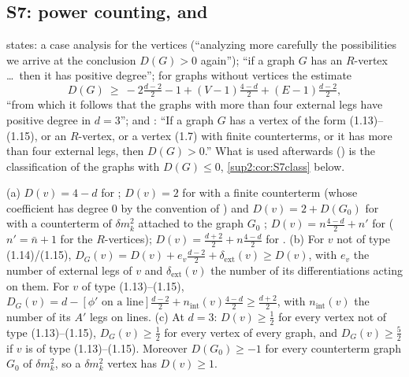 
\subsection{S7: power counting, \cite[(2.17)]{Ba3} and \cite[Cor.~2.3]{Ba3}}\label{sup2:ssec:S7}

\cite[pp.~428--429]{Ba3} states: a case analysis for the vertices \cite[(1.13)--(1.15)]{Ba3} (``analyzing more carefully the possibilities we arrive at the conclusion $D(G)>0$ again''); ``if a graph $G$ has an $R$-vertex \dots\ then it has positive degree''; for graphs without \cite[(1.13)--(1.15)]{Ba3} vertices the estimate
\begin{equation}\label{sup2:eq:217}
D(G)\ \ge\ -2\tfrac{d-2}2-1+(V-1)\tfrac{4-d}2+(E-1)\tfrac{d-2}2,\tag{2.17}
\end{equation}
``from which it follows that the graphs with more than four external legs have positive degree in $d=3$''; and \cite[Cor.~2.3]{Ba3}: ``If a graph $G$ has a vertex of the form (1.13)--(1.15), or an $R$-vertex, or a vertex (1.7) with finite counterterms, or it has more than four external legs, then $D(G)>0$.'' What is used afterwards (\cite[pp.~429--432]{Ba3}) is the classification of the graphs with $D(G)\le0$, \cref{sup2:cor:S7class} below.

\begin{lemma}\label{sup2:lem:S7vert}
\textup{(a)} $D(v)=4-d$ for \cite[(1.6)]{Ba3}; $D(v)=2$ for \cite[(1.7)]{Ba3} with a finite counterterm (whose coefficient has degree $0$ by the convention of \cite[p.~423]{Ba3}) and $D(v)=2+D(G_0)$ for \cite[(1.7)]{Ba3} with a counterterm of $\delta m^2_k$ attached to the graph $G_0$ \cite[(2.3)]{Ba3}; $D(v)=n\frac{4-d}2+n'$ for \cite[(1.8)--(1.11)]{Ba3} ($n'=\bar n+1$ for the $R$-vertices); $D(v)=\frac{d+2}2+n\frac{4-d}2$ for \cite[(1.13)--(1.15)]{Ba3}.
\textup{(b)} For $v$ not of type (1.14)/(1.15), $D_G(v)=D(v)+e_v\frac{d-2}2+\delta_{\mathrm{ext}}(v)\ge D(v)$, with $e_v$ the number of external legs of $v$ and $\delta_{\mathrm{ext}}(v)$ the number of its differentiations acting on them. For $v$ of type (1.13)--(1.15), $D_G(v)=d-[\phi'\text{ on a line}]\frac{d-2}2+n_{\mathrm{int}}(v)\frac{4-d}2\ge\frac{d+2}2$, with $n_{\mathrm{int}}(v)$ the number of its $A'$ legs on lines.
\textup{(c)} At $d=3$: $D(v)\ge\frac12$ for every vertex not of type (1.13)--(1.15), $D_G(v)\ge\frac12$ for every vertex of every graph, and $D_G(v)\ge\frac52$ if $v$ is of type (1.13)--(1.15). Moreover $D(G_0)\ge-1$ for every counterterm graph $G_0$ of $\delta m^2_k$, so a $\delta m^2_k$ vertex has $D(v)\ge1$.
\end{lemma}


